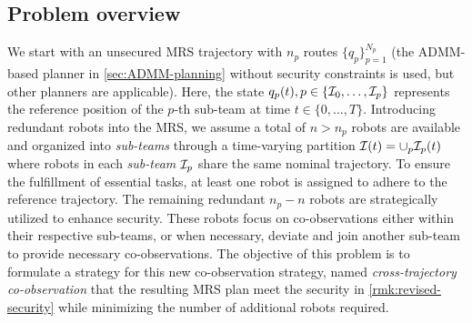 \documentclass[10pt,twocolumn,twoside]{IEEEtran}
\begin{document}
\subsection{Problem overview}
We start with an unsecured MRS trajectory with $n_p$ routes $\{q_p\}_{p=1}^{N_p}$ (the ADMM-based planner in \cref{sec:ADMM-planning} without security constraints is used, but other planners are applicable). Here, the state $q_p(t), p \in\{\mathcal{I}_0,\ldots,\mathcal{I}_{p}\}$ represents the reference position of the $p$-th sub-team at time $t\in\{0, \dots, T\}$. Introducing redundant robots into the MRS, we assume a total of $n > n_p$ robots are available and organized into \emph{sub-teams} through a time-varying partition $\mathcal{I}(t)=\cup_p \mathcal{I}_p(t)$ where robots in each \emph{sub-team} $\mathcal{I}_p$ share the same nominal trajectory. To ensure the fulfillment of essential tasks, at least one robot is assigned to adhere to the reference trajectory. The remaining redundant $n_p-n$ robots are strategically utilized to enhance security. These robots focus on co-observations either within their respective sub-teams, or when necessary, deviate and join another sub-team to provide necessary co-observations. The objective of this problem is to formulate a strategy for this new co-observation strategy, named \emph{cross-trajectory co-observation} that the resulting MRS plan meet the security in \cref{rmk:revised-security} while minimizing the number of additional robots required. 
\end{document}
